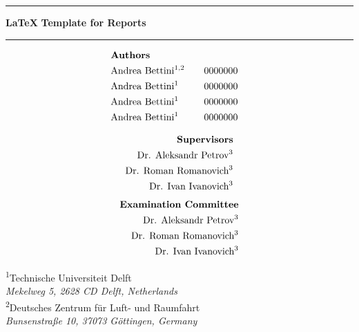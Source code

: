 \newcommand{\HRule}{\rule{\linewidth}{0.5mm}}
\thispagestyle{empty}
\HRule
\begin{center}
    \vspace{5mm}
    {\huge\textbf{\LaTeX\,\,Template for Reports}} \\
    \vspace{5mm}
\end{center}
\vspace*{-0.8em}
\HRule


\vspace*{-1em}
\begin{minipage}[t]{0.4\textwidth}
    \begin{alignat*}{3}
        &\text{\textbf{Authors}} \\
        &\text{Andrea Bettini}\textsuperscript{1,2}     &\quad& 0000000 \\
        &\text{Andrea Bettini}\textsuperscript{1}       &\quad& 0000000 \\
        &\text{Andrea Bettini}\textsuperscript{1}       &\quad& 0000000 \\
        &\text{Andrea Bettini}\textsuperscript{1}       &\quad& 0000000
    \end{alignat*}
\end{minipage}
\hfill
\begin{minipage}[t]{0.4\textwidth}
    \begin{alignat*}{1}
    \text{\textbf{Supervisors}}& \\
        \text{Dr. Aleksandr Petrov}\textsuperscript{3}&     \\
        \text{Dr. Roman Romanovich}\textsuperscript{3}&      \\
        \text{Dr. Ivan Ivanovich}\textsuperscript{3}&
    \end{alignat*}
    \begin{alignat*}{1}
    \text{\textbf{Examination Committee}}& \\
        \text{Dr. Aleksandr Petrov}\textsuperscript{3}&     \\
        \text{Dr. Roman Romanovich}\textsuperscript{3}&      \\
        \text{Dr. Ivan Ivanovich}\textsuperscript{3}&
    \end{alignat*}
\end{minipage}

\begin{center}
    \normalsize{\textsuperscript{1}Technische Universiteit Delft} \\\footnotesize{\textit{Mekelweg 5, 2628 CD Delft, Netherlands}} \\\vspace{3mm}
    \normalsize{\textsuperscript{2}Deutsches Zentrum für Luft- und Raumfahrt} \\\footnotesize{\textit{Bunsenstraße 10, 37073 Göttingen, Germany}}
    \\
\end{center}

